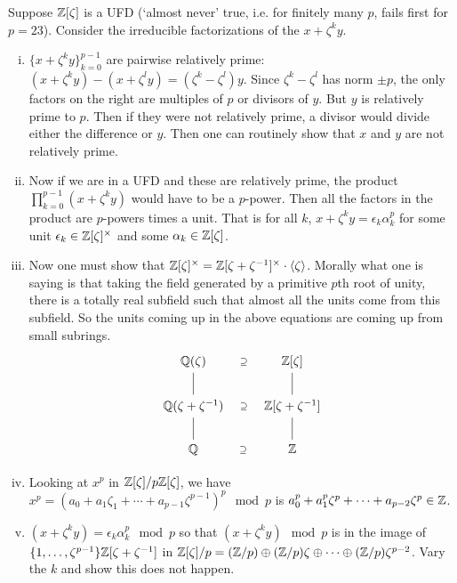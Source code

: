 Suppose $\mathbb{Z}[\zeta]$ is a UFD (`almost never' true, i.e. for finitely many $p$, fails first for $p=23$). Consider the irreducible factorizations of the $x+\zeta^k y$. 
\begin{enumerate}[(i)]
\item $\{x+\zeta^ky\}_{k=0}^{p-1}$ are pairwise relatively prime: $(x+\zeta^ky)-(x+\zeta^ly)=(\zeta^k-\zeta^l)y$. Since $\zeta^k-\zeta^l$ has norm $\pm p$, the only factors on the right are multiples of $p$ or divisors of $y$. But $y$ is relatively prime to $p$. Then if they were not relatively prime, a divisor would divide either the difference or $y$. Then one can routinely show that $x$ and $y$ are not relatively prime. 

\item Now if we are in a UFD and these are relatively prime, the product $\prod_{k=0}^{p-1} (x+ \zeta^k y)$ would have to be a $p$-power. Then all the factors in the product are $p$-powers times a unit. That is for all $k$, $x+\zeta^ky= \epsilon_k \alpha_k^p$ for some unit $\epsilon_k \in \mathbb{Z}[\zeta]^\times$ and some $\alpha_k \in \mathbb{Z}[\zeta]$.

\item Now one must show that $\mathbb{Z}[\zeta]^\times=\mathbb{Z}[\zeta+\zeta^{-1}]^\times \cdot \langle \zeta \rangle$. Morally what one is saying is that taking the field generated by a primitive $p$th root of unity, there is a totally real subfield such that almost all the units come from this subfield. So the units coming up in the above equations are coming up from small subrings. 
	\[
	\begin{tikzcd}
	\Q(\zeta) \arrow[draw=none]{r}[sloped,auto=false]{\supseteq} \arrow[dash]{d} & \Z[\zeta] \arrow[dash]{d} \\
	\Q(\zeta+\zeta^{-1}) \arrow[draw=none]{r}[sloped,auto=false]{\supseteq} \arrow[dash]{d} & \Z[\zeta+\zeta^{-1}] \arrow[dash]{d}\\
	\Q \arrow[draw=none]{r}[sloped,auto=false]{\supseteq} & \Z
	\end{tikzcd}
	\]

\item Looking at $x^p$ in $\mathbb{Z}[\zeta]/p\mathbb{Z}[\zeta]$, we have $x^p= (a_0+a_1\zeta_1+\cdots+a_{p-1}\zeta^{p-1})^p \mod p$ is $a_0^p + a_1^p \zeta^p + \cdots+a_{p-2}\zeta^p \in \mathbb{Z}$. 

\item  $(x+\zeta^k y)=\epsilon_k \alpha_k^p \mod p$ so that $(x+\zeta^ky) \mod p$ is in the image of $\{1,\ldots,\zeta^{p-1}\} \mathbb{Z}[\zeta+\zeta^{-1}]$ in $\mathbb{Z}[\zeta]/p=(\mathbb{Z}/p) \oplus (\mathbb{Z}/p)\zeta \oplus \cdots \oplus (\mathbb{Z}/p)\zeta^{p-2}$. Vary the $k$ and show this does not happen. 
\end{enumerate}

